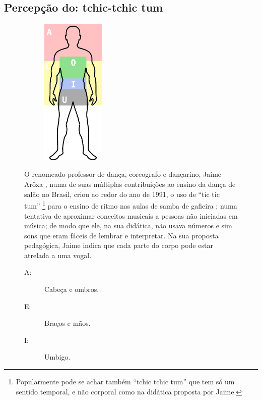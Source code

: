 \subsection{Percepção do: tchic-tchic tum}
\begin{figure}
\begin{elaboracion}[title=Jaime Arôxa e o ``tic tic tum'', width= 1.0\linewidth]
\begin{figure}
\centering
\includegraphics[width=0.33\textwidth]{chapters/cap-musicalidade-percepcion/aroxa-tic-tic-tum.eps}
\end{figure}
O renomeado professor de dança, coreografo e  dançarino, Jaime Arôxa \cite{JaimeAroxaSite},
numa de suas múltiplas contribuições ao ensino da dança de salão no Brasil,
criou ao redor do ano de 1991, 
o uso de ``tic tic tum''
\footnote{Popularmente pode se achar também ``tchic tchic tum'' que tem só um sentido temporal, 
e não corporal como na didática proposta por Jaime.} 
para o ensino de ritmo nas aulas de samba de gafieira \cite{EntrevistaJaimeAroxa1};
numa tentativa de aproximar conceitos musicais a pessoas não iniciadas em música;
de modo que ele, na sua didática, não usava números e sim sons que eram fáceis de lembrar e interpretar.
Na sua proposta pedagógica, 
Jaime indica que cada parte do corpo pode estar atrelada a uma vogal.
\begin{description} 
\item[A:] Cabeça e ombros. 
\item[E:] Braços e mãos. 
\item[I:] Umbigo.

\end{description}
\end{elaboracion}
\end{figure}
